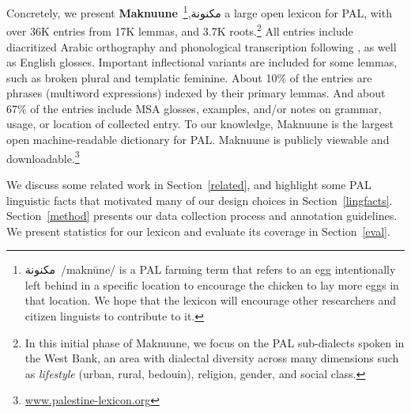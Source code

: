 Concretely, we present \textbf{Maknuune}~\foreignlanguage{arabic}{مكنونة},\footnote{\foreignlanguage{arabic}{مكنونة}~/maknūne/ is a PAL farming term that refers to an egg intentionally left behind in a specific location to encourage the chicken to lay more eggs in that location.
We hope that the lexicon will encourage other researchers and citizen linguists to contribute to it.}
%
a large open lexicon for PAL, with over 36K entries from 17K lemmas, and 3.7K roots.\footnote{In this initial phase of Maknuune, we focus on the PAL sub-dialects spoken in the West Bank, an area with dialectal diversity across many dimensions such as \textit{lifestyle} (urban, rural, bedouin), religion, gender, and social class.}
%
All entries include diacritized Arabic orthography and phonological transcription following \citep{Habash:2018:unified}, as well as English glosses. Important inflectional variants are included for some lemmas, such as broken plural and templatic feminine. %
About 10\%  of the entries are phrases (multiword expressions) indexed by their primary lemmas. And about 67\%  
of the entries include MSA glosses,  examples, and/or notes on grammar, usage, or location of collected entry.
%
To our knowledge, Maknuune is the largest open machine-readable dictionary for PAL. Maknuune is publicly viewable and downloadable.\footnote{\url{www.palestine-lexicon.org}}
%

We discuss some related work in Section~\ref{related}, and highlight some PAL linguistic facts %
that motivated many of our 
design choices in Section~\ref{lingfacts}.  Section~\ref{method} presents our data collection process and annotation guidelines. We present statistics for our lexicon and evaluate its coverage 
in Section~\ref{eval}.




